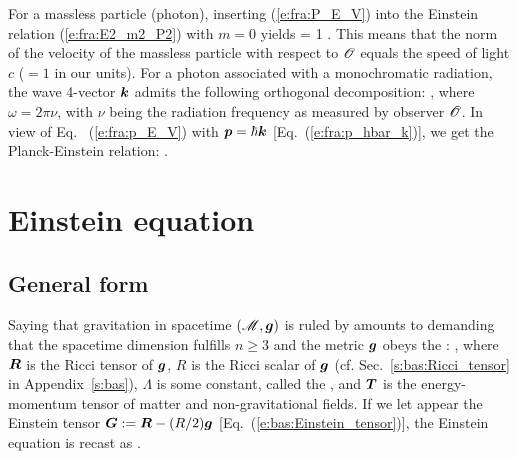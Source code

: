 For a massless particle (photon), inserting (\ref{e:fra:P_E_V}) into the
Einstein relation (\ref{e:fra:E2_m2_P2}) with $m=0$ yields
\be \label{e:fra:photon_V_one}
    \cdot{} = 1 .
\ee
This means that the norm of the velocity of the massless particle with respect to $\mathscr{O}$
equals the speed of light $c$ ($=1$ in our units).
For a photon associated with a monochromatic radiation, the wave 4-vector $\bm{k}$
admits the following orthogonal decomposition:
\be
   ,
\ee
where $\omega = 2\pi \nu$, with $\nu$ being the radiation frequency as measured by
observer $\mathscr{O}$. In view of Eq.~ (\ref{e:fra:p_E_V}) with $\bm{p} = \hbar\bm{k}$
[Eq.~(\ref{e:fra:p_hbar_k})], we
get the Planck-Einstein relation:
\be \label{e:fra:Planck_Einstein}
    .
\ee

\section{Einstein equation} \label{s:fra:Einstein_eq}

\subsection{General form}

Saying that gravitation in spacetime $(\mathscr{M}, \bm{g})$ is ruled by
 amounts
to demanding that the spacetime dimension fulfills $n\geq 3$ and
the metric $\bm{g}$ obeys the :
\be \label{e:fra:Einstein_eq}
    ,
\ee
where $\bm{R}$ is the Ricci tensor of $\bm{g}$, $R$ is the
Ricci scalar of $\bm{g}$
(cf. Sec.~\ref{s:bas:Ricci_tensor} in Appendix~\ref{s:bas}), $\Lambda$ is some
constant, called the ,
and $\bm{T}$ is the energy-momentum tensor of
matter and non-gravitational fields. If we let appear the
Einstein tensor $\bm{G} := \bm{R} - (R/2) \bm{g}$
[Eq.~(\ref{e:bas:Einstein_tensor})], the Einstein equation is recast as
\be \label{e:fra:Einstein_eq_G}
    .
\ee

